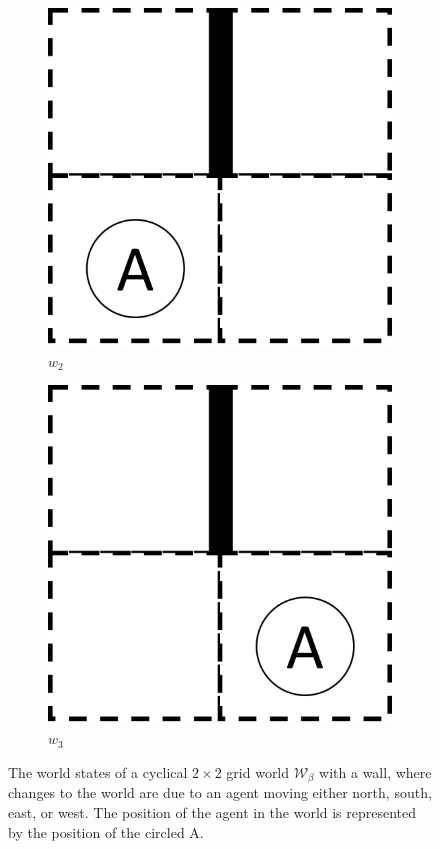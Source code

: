 \begin{figure}[H]
\begin{subfigure}[b]{0.45\linewidth}
        \includegraphics[width=0.5\linewidth]{5BeyondSBDRL/GlobalAlgebras/Images/2x2_with_wall_world_states/w2.png}
        \caption{$w_{2}$}
    \end{subfigure}
    \begin{subfigure}[b]{0.45\linewidth}
        \centering
        \includegraphics[width=0.5\linewidth]{5BeyondSBDRL/GlobalAlgebras/Images/2x2_with_wall_world_states/w3.png}
        \caption{$w_{3}$}
    \end{subfigure}
  \caption{
  The world states of a cyclical $2\times 2$ grid world $\mathscr{W}_{\beta}$ with a wall, where changes to the world are due to an agent moving either north, south, east, or west.
  The position of the agent in the world is represented by the position of the circled A.
  }
\label{fig:2x2_cyclical_grid_world_wall_states}
\end{figure}

